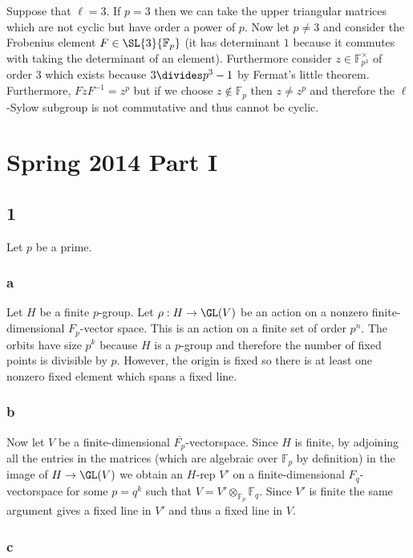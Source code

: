 \documentclass[12pt]{article}
\renewcommand{\F}{\mathbb{F}}
\begin{document}
Suppose that $\ell = 3$. If $p = 3$ then we can take the upper triangular matrices which are not cyclic but have order a power of $p$. Now let $p \neq 3$ and consider the Frobenius element $F \in \SL{3}{\F_p}$ (it has determinant $1$ because it commutes with taking the determinant of an element). Furthermore consider $z \in \F_{p^3}^\times$ of order $3$ which exists because $3 \divides p^3 - 1$ by Fermat's little theorem. Furthermore, $F z F^{-1} = z^p$ but if we choose $z \notin \F_p$ then $z \neq z^p$ and therefore the $\ell$-Sylow subgroup is not commutative and thus cannot be cyclic.

\section{Spring 2014 Part I}

\subsection{1}

Let $p$ be a prime.

\subsubsection{a}

Let $H$ be a finite $p$-group. Let $\rho : H \to \GL(V)$ be an action on a nonzero finite-dimensional $F_p$-vector space. This is an action on a finite set of order $p^n$. The orbits have size $p^k$ because $H$ is a $p$-group and therefore the number of fixed points is divisible by $p$. However, the origin is fixed so there is at least one nonzero fixed element which spans a fixed line.

\subsubsection{b}

Now let $V$ be a finite-dimensional $\overline{F_p}$-vectorspace. Since $H$ is finite, by adjoining all the entries in the matrices (which are algebraic over $\F_p$ by definition) in the image of $H \to \GL(V)$ we obtain an $H$-rep $V'$ on a finite-dimensional $F_q$-vectorspace for some $p = q^k$ such that $V = V' \otimes_{\F_p} \F_q$. Since $V'$ is finite the same argument gives a fixed line in $V'$ and thus a fixed line in $V$.

\subsubsection{c}
\end{document}
